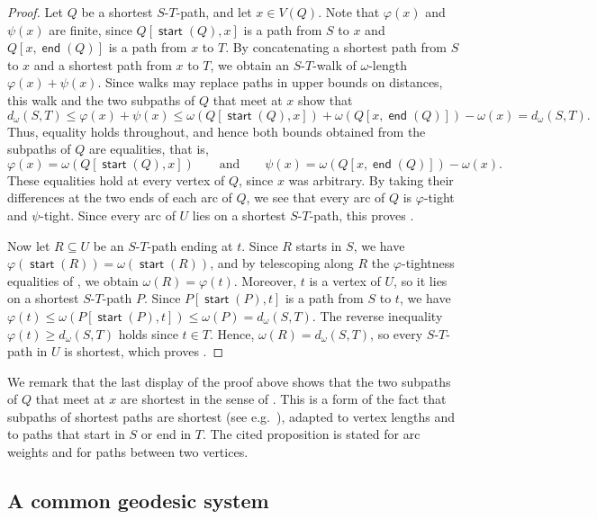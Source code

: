 \documentclass[fontsize=12pt,leading=14pt]{fullpaper}
\DeclareMathOperator{\st}{\mathsf{start}}
\DeclareMathOperator{\en}{\mathsf{end}}
\begin{document}
\begin{proof}
  Let $Q$ be a shortest $S$-$T$-path, and let $x\in V(Q)$.
  Note that $\varphi(x)$ and $\psi(x)$ are finite, since $Q[\st(Q),x]$ is a path from $S$ to $x$ and $Q[x,\en(Q)]$ is a path from $x$ to $T$.
  By concatenating a shortest path from $S$ to $x$ and a shortest path from $x$ to $T$, we obtain an $S$-$T$-walk of $\omega$-length $\varphi(x)+\psi(x)$.
  Since walks may replace paths in upper bounds on distances, this walk and the two subpaths of $Q$ that meet at $x$ show that
  \[
    d_\omega(S,T)\le\varphi(x)+\psi(x)
    \le\omega(Q[\st(Q),x])+\omega(Q[x,\en(Q)])-\omega(x)
    =d_\omega(S,T).
  \]
  Thus, equality holds throughout, and hence both bounds obtained from the subpaths of $Q$ are equalities, that is,
  \[
    \varphi(x)=\omega(Q[\st(Q),x])
    \qquad\text{and}\qquad
    \psi(x)=\omega(Q[x,\en(Q)])-\omega(x).
  \]
  These equalities hold at every vertex of $Q$, since $x$ was arbitrary.
  By taking their differences at the two ends of each arc of $Q$, we see that every arc of $Q$ is $\varphi$-tight and $\psi$-tight.
  Since every arc of $U$ lies on a shortest $S$-$T$-path, this proves .

  Now let $R\subseteq U$ be an $S$-$T$-path ending at $t$.
  Since $R$ starts in $S$, we have $\varphi(\st(R))=\omega(\st(R))$, and by telescoping along $R$ the $\varphi$-tightness equalities of , we obtain $\omega(R)=\varphi(t)$.
  Moreover, $t$ is a vertex of $U$, so it lies on a shortest $S$-$T$-path $P$.
  Since $P[\st(P),t]$ is a path from $S$ to $t$, we have $\varphi(t)\le\omega(P[\st(P),t])\le\omega(P)=d_\omega(S,T)$.
  The reverse inequality $\varphi(t)\ge d_\omega(S,T)$ holds since $t\in T$.
  Hence, $\omega(R)=d_\omega(S,T)$, so every $S$-$T$-path in $U$ is shortest, which proves .
\end{proof}

We remark that the last display of the proof above shows that the two subpaths of $Q$ that meet at $x$ are shortest in the sense of .
This is a form of the fact that subpaths of shortest paths are shortest (see e.g.~\cite[Proposition~2.2.1]{BangJensenG02}), adapted to vertex lengths and to paths that start in $S$ or end in $T$.
The cited proposition is stated for arc weights and for paths between two vertices.

\subsection{A common geodesic system}\label{sec:system}
\end{document}
